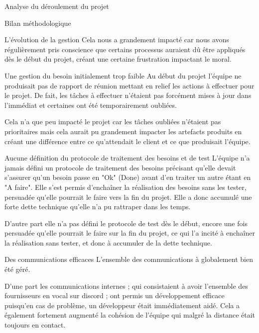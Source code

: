 \documentclass[]{article}
\begin{document}
{\begin{section}{Analyse du déroulement du projet}
\begin{subsection}{Bilan méthodologique}
\begin{subsubsection}{L'évolution de la gestion}
         Cela nous a grandement impacté car nous avons régulièrement pris conscience que certains processus auraient dû être appliqués dès le début du projet, créant une certaine frustration impactant le moral.
     \end{subsubsection}

\newpage

     \begin{subsubsection}{Une gestion du besoin initialement trop faible}
         Au début du projet l'équipe ne produisait pas de rapport de réunion mettant en relief les actions à effectuer pour le projet. De fait, les tâches à effectuer n'étaient pas forcément mises à jour dans l'immédiat et certaines ont été temporairement oubliées.

         Cela n'a que peu impacté le projet car les tâches oubliées n'étaient pas prioritaires mais cela aurait pu grandement impacter les artefacts produits en créant une différence entre ce qu'attendait le client et ce que produisait l'équipe.
     \end{subsubsection}

     \begin{subsubsection}{Aucune définition du protocole de traitement des besoins et de test}
         L'équipe n'a jamais défini un protocole de traitement des besoins précisant qu'elle devait s'assurer qu'un besoin passe en "Ok" (Done) avant d'en traiter un autre étant en "A faire". Elle s'est permis d'enchaîner la réalisation des besoins sans les tester, persuadée qu'elle pourrait le faire vers la fin du projet. Elle a donc accumulé une forte dette technique qu'elle n'a pu rattraper dans les temps.

         D'autre part elle n'a pas défini le protocole de test dès le début, encore une fois persuadée qu'elle pourrait le faire sur la fin du projet, ce qui l'a incité à enchaîner la réalisation sans tester, et donc à accumuler de la dette technique.
     \end{subsubsection}

     \begin{subsubsection}{Des communications efficaces}
         L'ensemble des communications à globalement bien été géré.

         D'une part les communications internes ; qui consistaient à avoir l'ensemble des fournisseurs en vocal sur discord ; ont permis un développement efficace puisqu'en cas de problème, un développeur était immédiatement aidé. Cela a également fortement augmenté la cohésion de l'équipe qui malgré la distance était toujours en contact.


\end{subsubsection}
\end{subsection}
\end{section}}
\end{document}
